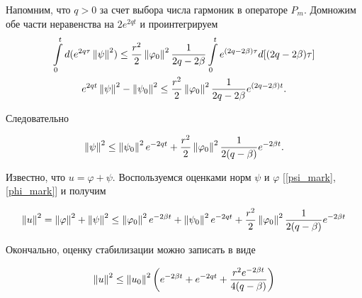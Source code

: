 Напомним, что $q > 0$ за счет выбора числа гармоник в операторе $P_m$.
Домножим обе части неравенства на $2e^{2qt}$ и проинтегрируем
\begin{gather*}
    \int\limits_0^t{d(e^{2q\tau}} \left\lVert\psi\right\rVert^2) \le 
    \frac{r^2}{2} \left\lVert\varphi_0\right\rVert^2 \frac{1}{2q - 2\beta} 
    \int\limits_0^t {e^{(2q -2\beta) \tau} d[(2q -2\beta) \tau]}\\*
    e^{2qt} \left\lVert\psi\right\rVert^2 - \left\lVert\psi_0\right\rVert^2 \le \frac{r^2}{2}
    \left\lVert\varphi_0\right\rVert^2 \frac{1}{2q - 2\beta} e^{(2q -2\beta)t}.
\end{gather*}

Следовательно

\begin{equation}\label{psi_mark}
    \left\lVert\psi\right\rVert^2 \le \left\lVert\psi_0\right\rVert^2 e^{-2qt} + \frac{r^2}{2} 
    \left\lVert\varphi_0\right\rVert^2 \frac{1}{2(q - \beta)} e^{-2\beta t}.
\end{equation}

Известно, что $u = \varphi + \psi$. Воспользуемся оценками норм $\psi$ и 
$\varphi$ [\eqref{psi_mark}, \eqref{phi_mark}] и получим

\begin{gather*}
    \left\lVert u\right\rVert^2 = \left\lVert\varphi\right\rVert^2 + \left\lVert\psi\right\rVert^2 \le \left\lVert\varphi_0\right\rVert^2 
    e^{-2\beta t} + \left\lVert\psi_0\right\rVert^2 e^{-2qt} + \frac{r^2}{2} \left\lVert\varphi_0\right\rVert^2 
    \frac{1}{2(q - \beta)} e^{-2\beta t}
\end{gather*}

Окончально, оценку стабилизации можно записать в виде

\begin{equation}
    \left\lVert u\right\rVert^2 \le \left\lVert u_0\right\rVert^2 \left( e^{-2\beta t} + e^{-2qt} + 
    \frac{r^2 e^{-2\beta t}}{4(q - \beta)} \right)
\end{equation}
